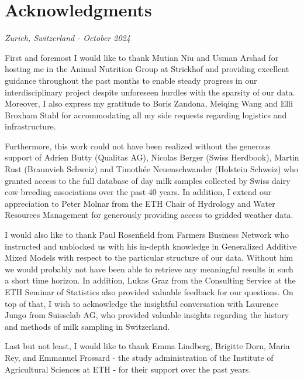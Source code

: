 \chapter{Acknowledgments}

\textit{Zurich, Switzerland - October 2024}

\vspace*{\baselineskip}
First and foremost I would like to thank Mutian Niu and Usman Arshad for hosting me in the Animal Nutrition Group at Strickhof and providing excellent guidance throughout the past months to enable steady progress in our interdisciplinary project despite unforeseen hurdles with the sparsity of our data. Moreover, I also express my gratitude to Boris Zandona, Meiqing Wang and Elli Broxham Stahl for accommodating all my side requests regarding logistics and infrastructure.

\vspace*{\baselineskip}
Furthermore, this work could not have been realized without the generous support of Adrien Butty (Qualitas AG), Nicolas Berger (Swiss Herdbook), Martin Rust (Braunvieh Schweiz) and Timothée Neuenschwander (Holstein Schweiz) who granted access to the full database of day milk samples collected by Swiss dairy cow breeding associations over the past 40 years. In addition, I extend our appreciation to Peter Molnar from the ETH Chair of Hydrology and Water Resources Management for generously providing access to gridded weather data.

\vspace*{\baselineskip}
I would also like to thank Paul Rosenfield from Farmers Business Network who instructed and unblocked us with his in-depth knowledge in Generalized Additive Mixed Models with respect to the particular structure of our data. Without him we would probably not have been able to retrieve any meaningful results in such a short time horizon. In addition, Lukas Graz from the Consulting Service at the ETH Seminar of Statistics also provided valuable feedback for our questions. On top of that, I wish to acknowledge the insightful conversation with Laurence Jungo from Suisselab AG, who provided valuable insights regarding the history and methods of milk sampling in Switzerland.

\vspace*{\baselineskip}
Last but not least, I would like to thank Emma Lindberg, Brigitte Dorn, Maria Rey, and Emmanuel Frossard - the study administration of the Institute of Agricultural Sciences at ETH - for their support over the past years.